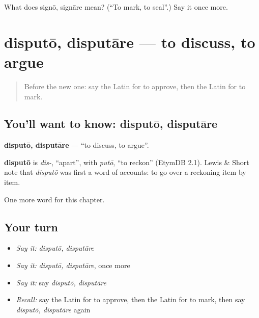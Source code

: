 \begin{tcolorbox}[breakable,colback=teal!4,colframe=teal!35!black,title={Before you move on}]
What does signō, signāre mean? (\textquotedblleft{}To mark, to seal\textquotedblright{}.) Say it once more.
\end{tcolorbox}
\section[disputō, disputāre]{disputō, disputāre — to discuss, to argue}

\label{lesson:LA-C166-disputo}



\begin{quote}
Before the new one: say the Latin for to approve, then the Latin for to mark.
\end{quote}

\subsection*{You'll want to know: disputō, disputāre}
\textbf{disputō, disputāre} — \textquotedblleft{}to discuss, to argue\textquotedblright{}.

\begin{cousinweb}
\textbf{disputō} is \emph{dis-}, \textquotedblleft{}apart\textquotedblright{}, with \emph{putō}, \textquotedblleft{}to reckon\textquotedblright{} (EtymDB 2.1). Lewis \& Short note that \emph{disputō} was first a word of accounts: to go over a reckoning item by item.
\end{cousinweb}

\begin{grammarlens}[title={What you've built}]
One more word for this chapter.
\end{grammarlens}

\subsection*{Your turn}
\begin{itemize}
\raggedright
  \item \emph{Say it:} \emph{disputō, disputāre}
  \item \emph{Say it:} \emph{disputō, disputāre}, once more
  \item \emph{Say it:} say \emph{disputō, disputāre}
  \item \emph{Recall:} say the Latin for to approve, then the Latin for to mark, then say \emph{disputō, disputāre} again
\end{itemize}

